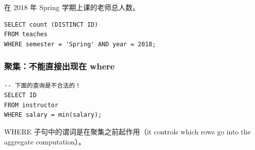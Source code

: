 \documentclass[aspectratio=169, 14pt]{beamer}
\begin{document}
\begin{frame}[fragile]
	在 2018 年 Spring 学期上课的老师总人数。

	\begin{verbatim}
SELECT count (DISTINCT ID)
FROM teaches
WHERE semester = 'Spring' AND year = 2018;
\end{verbatim}


\end{frame}

\begin{frame}[fragile]
	\frametitle{聚集：不能直接出现在 where}

	\begin{verbatim}
-- 下面的查询是不合法的！
SELECT ID
FROM instructor
WHERE salary = min(salary);
    \end{verbatim}

	WHERE 子句中的谓词是在聚集之前起作用（it controls which rows go into the aggregate computation）。

\end{frame}
\end{document}
